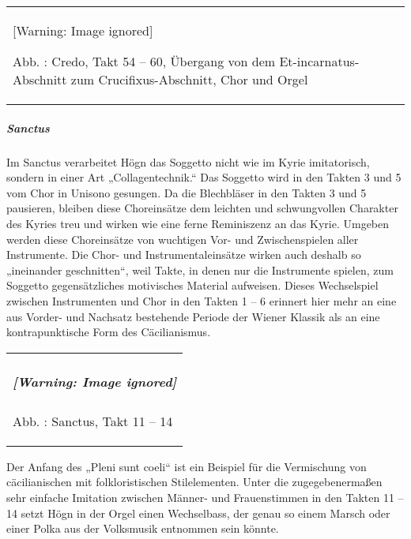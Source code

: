\documentclass[a4paper]{article}
\newcounter{Abb}
\renewcommand\theAbb{\arabic{Abb}}
\begin{document}
\begin{center}
\tablefirsthead{}
\tablehead{}
\tabletail{}
\tablelasttail{}
\begin{supertabular}{m{13.070001cm}}
  [Warning: Image ignored] %
 
Abb. \stepcounter{Abb}{\theAbb}: Credo, Takt 54 – 60, Übergang von dem
Et-incarnatus-Abschnitt zum Crucifixus-Abschnitt, Chor und Orgel

\\
\end{supertabular}
\end{center}
\subparagraph{Sanctus}
Im Sanctus verarbeitet Högn das Soggetto nicht wie im Kyrie
imitatorisch, sondern in einer Art „Collagentechnik.“ Das Soggetto wird
in den Takten 3 und 5 vom Chor in Unisono gesungen. Da die Blechbläser
in den Takten 3 und 5 pausieren, bleiben diese Choreinsätze dem
leichten und schwungvollen Charakter des Kyries treu und wirken wie
eine ferne Reminiszenz an das Kyrie. Umgeben werden diese Choreinsätze
von wuchtigen Vor- und Zwischenspielen aller Instrumente. Die Chor- und
Instrumentaleinsätze wirken auch deshalb so „ineinander geschnitten“,
weil Takte, in denen nur die Instrumente spielen, zum Soggetto
gegensätzliches motivisches Material aufweisen. Dieses Wechselspiel
zwischen Instrumenten und Chor in den Takten 1 – 6 erinnert hier mehr
an eine aus Vorder- und Nachsatz bestehende Periode der Wiener Klassik
als an eine kontrapunktische Form des Cäcilianismus.

\begin{center}
\tablefirsthead{}
\tablehead{}
\tabletail{}
\tablelasttail{}
\begin{supertabular}{m{11.689cm}}
\subparagraph[]{  [Warning: Image ignored]
 }
Abb. \stepcounter{Abb}{\theAbb}: Sanctus, Takt 11 – 14\\
\end{supertabular}
\end{center}
Der Anfang des „Pleni sunt coeli“ ist ein Beispiel für die Vermischung
von cäcilianischen mit folkloristischen Stilelementen. Unter die
zugegebenermaßen sehr einfache Imitation zwischen Männer- und
Frauenstimmen in den Takten 11 – 14 setzt Högn in der Orgel einen
Wechselbass, der genau so einem Marsch oder einer Polka aus der
Volksmusik entnommen sein könnte.
\end{document}
